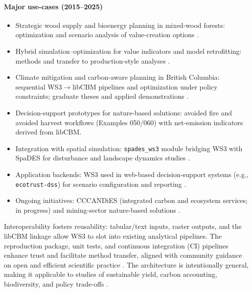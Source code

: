 \documentclass[review]{elsarticle}
\begin{document}
\paragraph{Major use-cases (2015--2025)}
\begin{itemize}
  \item Strategic wood supply and bioenergy planning in mixed-wood forests: optimization and scenario analysis of value-creation options \citep{cantegril2019bioenergy}.
  \item Hybrid simulation--optimization for value indicators and model retrofitting: methods and transfer to production-style analyses \citep{paradis2018retro, paradis2018estimating}.
  \item Climate mitigation and carbon-aware planning in British Columbia: sequential WS3$\to$libCBM pipelines and optimization under policy constraints; graduate theses and applied demonstrations \citep{ke2024climate, yan2025mathematical, yan_repo}.
  \item Decision-support prototypes for nature-based solutions: avoided fire and avoided harvest workflows (Examples 050/060) with net-emission indicators derived from libCBM.
  \item Integration with spatial simulation: \texttt{spades\_ws3} module bridging WS3 with SpaDES for disturbance and landscape dynamics studies \citep{spades, spades_ws3}.
  \item Application backends: WS3 used in web-based decision-support systems (e.g., \texttt{ecotrust-dss}) for scenario configuration and reporting \citep{ecotrust-dss}.
  \item Ongoing initiatives: CCCANDiES (integrated carbon and ecosystem services; in progress) and mining-sector nature-based solutions \citep{ghasemi2025decarbonization}. 
\end{itemize}

Interoperability fosters reusability: tabular/text inputs, raster outputs, and the libCBM linkage allow WS3 to slot into existing analytical pipelines. The reproduction package, unit tests, and continuous integration (CI) pipelines enhance trust and facilitate method transfer, aligned with community guidance on open and efficient scientific practice \citep{hampton2015tao, lowndes2017path}. The architecture is intentionally general, making it applicable to studies of sustainable yield, carbon accounting, biodiversity, and policy trade-offs \citep{boisvenue2022managing}.
\end{document}
